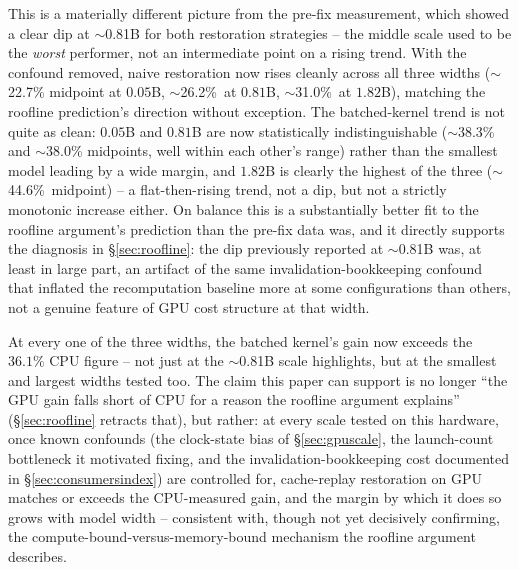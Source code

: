 \documentclass{article}
\begin{document}
This is a materially different picture from the pre-fix measurement, which showed a clear dip at
$\sim$0.81B for both restoration strategies -- the middle scale used to be the \emph{worst}
performer, not an intermediate point on a rising trend. With the confound removed, naive
restoration now rises cleanly across all three widths ($\sim$22.7\% midpoint at $0.05$B,
$\sim$26.2\%\ at $0.81$B, $\sim$31.0\%\ at $1.82$B), matching the roofline prediction's direction
without exception. The batched-kernel trend is not quite as clean: $0.05$B and $0.81$B are now
statistically indistinguishable ($\sim$38.3\% and $\sim$38.0\% midpoints, well within each other's
range) rather than the smallest model leading by a wide margin, and $1.82$B is clearly the highest
of the three ($\sim$44.6\%\ midpoint) -- a flat-then-rising trend, not a dip, but not a strictly
monotonic increase either. On balance this is a substantially better fit to the roofline argument's
prediction than the pre-fix data was, and it directly supports the diagnosis in \S\ref{sec:roofline}:
the dip previously reported at $\sim$0.81B was, at least in large part, an artifact of the same
invalidation-bookkeeping confound that inflated the recomputation baseline more at some
configurations than others, not a genuine feature of GPU cost structure at that width.

At every one of the three widths, the batched kernel's gain now exceeds the $36.1\%$ CPU figure --
not just at the $\sim$0.81B scale  highlights, but at the smallest and largest
widths tested too. The claim this paper can support is no longer ``the GPU gain falls short of CPU
for a reason the roofline argument explains'' (\S\ref{sec:roofline} retracts that), but rather: at
every scale tested on this hardware, once known confounds (the clock-state bias of
\S\ref{sec:gpuscale}, the launch-count bottleneck it motivated fixing, and the invalidation-bookkeeping
cost documented in \S\ref{sec:consumersindex}) are controlled for, cache-replay restoration on GPU
matches or exceeds the CPU-measured gain, and the margin by which it does so grows with model
width -- consistent with, though not yet decisively confirming, the compute-bound-versus-memory-bound
mechanism the roofline argument describes.
\end{document}
